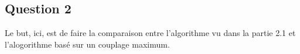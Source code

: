   \subsection{Question 2}
  Le but, ici, est de faire la comparaison entre l'algorithme vu dans la
  partie 2.1 et l'alogorithme basé sur un couplage maximum.
